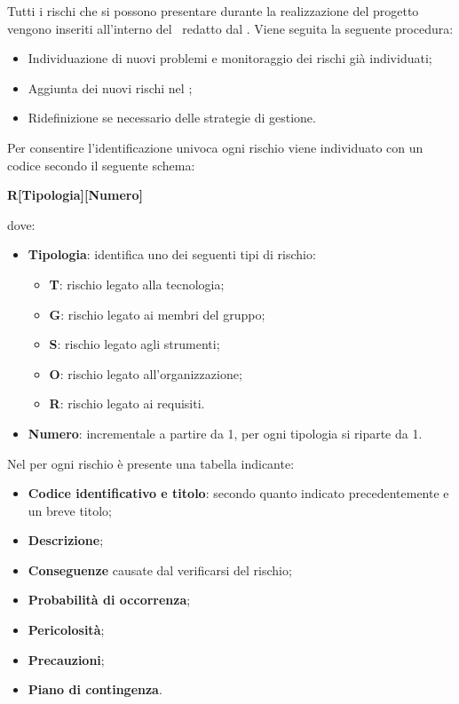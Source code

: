\label{GestioneRischi}Tutti i rischi che si possono presentare durante la realizzazione del progetto vengono inseriti all'interno del \PdPv\ redatto dal \Responsabile.
Viene seguita la seguente procedura:
\begin{itemize}
	\item Individuazione di nuovi problemi e monitoraggio dei rischi già individuati;
	\item Aggiunta dei nuovi rischi nel \textit{\PdP};
	\item Ridefinizione se necessario delle strategie di gestione.
\end{itemize}
Per consentire l'identificazione univoca ogni rischio viene individuato con un codice secondo il seguente schema:
\begin{center}
	\textbf{R[Tipologia][Numero]}
\end{center}
dove: 
\begin{itemize}
	\item \textbf{Tipologia}: identifica uno dei seguenti tipi di rischio:
		\begin{itemize}
			\item \textbf{T}: rischio legato alla tecnologia;
			\item \textbf{G}: rischio legato ai membri del gruppo;
			\item \textbf{S}: rischio legato agli strumenti;
			\item \textbf{O}: rischio legato all'organizzazione;
			\item \textbf{R}: rischio legato ai requisiti.
		\end{itemize}
	\item \textbf{Numero}: incrementale a partire da 1, per ogni tipologia si riparte da 1.
\end{itemize}
Nel   per ogni rischio è presente una tabella indicante:
\begin{itemize}
	\item \textbf{Codice identificativo e titolo}: secondo quanto indicato precedentemente e un breve titolo;
	\item \textbf{Descrizione};
	\item \textbf{Conseguenze} causate dal verificarsi del rischio;
	\item \textbf{Probabilità di occorrenza};
	\item \textbf{Pericolosità};
	\item \textbf{Precauzioni};
	\item \textbf{Piano di contingenza}.
\end{itemize}

